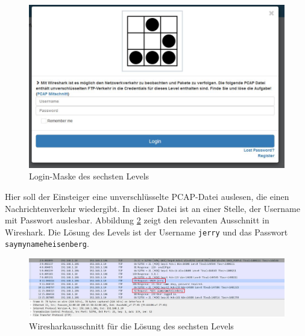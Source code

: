 \begin{figure}[H]
	\centering
	\includegraphics[width=\textwidth]{images/LoginParcours/login_parcrous_level6_wireshark_maske.jpg}
	\caption{Login-Maske des sechsten Levels}
	\label{fig:login_parcrous_level6_wireshark_maske}
\end{figure}

Hier soll der Einsteiger eine unverschlüsselte PCAP-Datei auslesen, die einen Nachrichtenverkehr wiedergibt. In dieser Datei ist an einer Stelle, der Username mit Passwort auslesbar. Abbildung \ref{fig:login_parcrous_level6_wireshark_solution} zeigt den relevanten Ausschnitt in Wireshark. Die Lösung des Levels ist der Username \colorbox{altgray}{\lstinline|jerry|} und das Passwort \colorbox{altgray}{\lstinline|saymynameheisenberg|}. 

\begin{figure}[H]
	\centering
	\includegraphics[width=\textwidth]{images/LoginParcours/login_parcrous_level6_wireshark_solution.jpg}
	\caption{Wiresharkausschnitt für die Lösung des sechsten Levels}
	\label{fig:login_parcrous_level6_wireshark_solution}
\end{figure}

